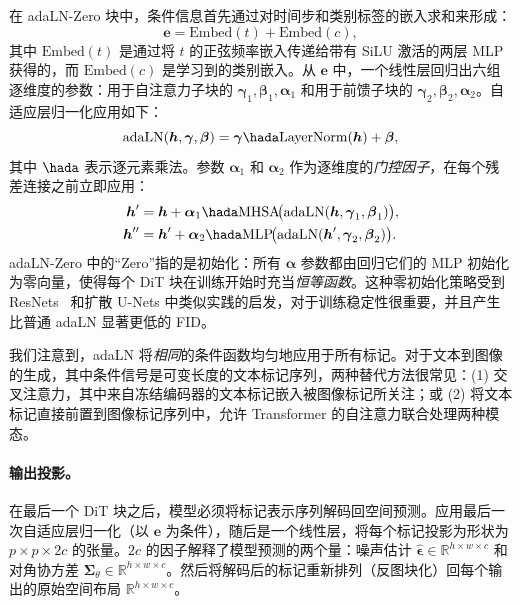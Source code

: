 \documentclass[../../book-main_zh.tex]{subfiles}
\begin{document}
在 adaLN-Zero 块中，条件信息首先通过对时间步和类别标签的嵌入求和来形成：
\begin{equation}
    \boldsymbol{e} = \mathrm{Embed}(t) + \mathrm{Embed}(c),
\end{equation}
其中 $\mathrm{Embed}(t)$ 是通过将 $t$ 的正弦频率嵌入传递给带有 SiLU 激活的两层 MLP 获得的，而 $\mathrm{Embed}(c)$ 是学习到的类别嵌入。从 $\boldsymbol{e}$ 中，一个线性层回归出六组逐维度的参数：用于自注意力子块的 $\boldsymbol{\gamma}_1, \boldsymbol{\beta}_1, \boldsymbol{\alpha}_1$ 和用于前馈子块的 $\boldsymbol{\gamma}_2, \boldsymbol{\beta}_2, \boldsymbol{\alpha}_2$。自适应层归一化应用如下：
\begin{equation}
    \mathrm{adaLN}(\boldsymbol{h}, \boldsymbol{\gamma}, \boldsymbol{\beta}) = \boldsymbol{\gamma} \hada \mathrm{LayerNorm}(\boldsymbol{h}) + \boldsymbol{\beta},
\end{equation}
其中 $\hada$ 表示逐元素乘法。参数 $\boldsymbol{\alpha}_1$ 和 $\boldsymbol{\alpha}_2$ 作为逐维度的\emph{门控因子}，在每个残差连接之前立即应用：
\begin{equation}
\begin{aligned}
    \boldsymbol{h}' &= \boldsymbol{h} + \boldsymbol{\alpha}_1 \hada \mathrm{MHSA}\!\big(\mathrm{adaLN}(\boldsymbol{h}, \boldsymbol{\gamma}_1, \boldsymbol{\beta}_1)\big), \\
    \boldsymbol{h}'' &= \boldsymbol{h}' + \boldsymbol{\alpha}_2 \hada \mathrm{MLP}\!\big(\mathrm{adaLN}(\boldsymbol{h}', \boldsymbol{\gamma}_2, \boldsymbol{\beta}_2)\big).
\end{aligned}
\end{equation}
adaLN-Zero 中的“Zero”指的是初始化：所有 $\boldsymbol{\alpha}$ 参数都由回归它们的 MLP 初始化为零向量，使得每个 DiT 块在训练开始时充当\emph{恒等函数}。这种零初始化策略受到 ResNets~\citep{goyal2017accurate} 和扩散 U-Nets 中类似实践的启发，对于训练稳定性很重要，并且产生比普通 adaLN 显著更低的 FID。

我们注意到，adaLN 将\emph{相同}的条件函数均匀地应用于所有标记。对于文本到图像的生成，其中条件信号是可变长度的文本标记序列，两种替代方法很常见：(1) 交叉注意力，其中来自冻结编码器的文本标记嵌入被图像标记所关注；或 (2) 将文本标记直接前置到图像标记序列中，允许 Transformer 的自注意力联合处理两种模态。

\paragraph{输出投影。}
在最后一个 DiT 块之后，模型必须将标记表示序列解码回空间预测。应用最后一次自适应层归一化（以 $\boldsymbol{e}$ 为条件），随后是一个线性层，将每个标记投影为形状为 $p \times p \times 2c$ 的张量。$2c$ 的因子解释了模型预测的两个量：噪声估计 $\hat{\boldsymbol{\epsilon}} \in \mathbb{R}^{h \times w \times c}$ 和对角协方差 $\boldsymbol{\Sigma}_\theta \in \mathbb{R}^{h \times w \times c}$。然后将解码后的标记重新排列（反图块化）回每个输出的原始空间布局 $\mathbb{R}^{h \times w \times c}$。
\end{document}
